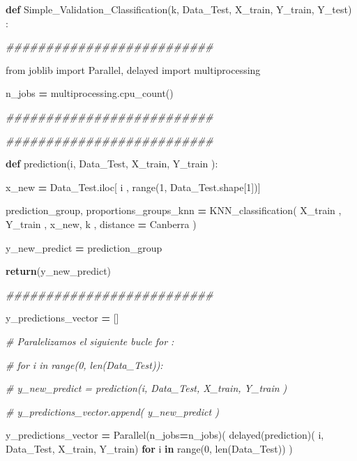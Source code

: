 \documentclass[
  11pt,
  a4paper,
]{article}
\newenvironment{Shaded}{\begin{snugshade}}{\end{snugshade}}
\newcommand{\BuiltInTok}[1]{#1}
\newcommand{\CommentTok}[1]{\textcolor[rgb]{0.56,0.35,0.01}{\textit{#1}}}
\newcommand{\ControlFlowTok}[1]{\textcolor[rgb]{0.13,0.29,0.53}{\textbf{#1}}}
\newcommand{\DecValTok}[1]{\textcolor[rgb]{0.00,0.00,0.81}{#1}}
\newcommand{\ImportTok}[1]{#1}
\newcommand{\KeywordTok}[1]{\textcolor[rgb]{0.13,0.29,0.53}{\textbf{#1}}}
\newcommand{\NormalTok}[1]{#1}
\newcommand{\OperatorTok}[1]{\textcolor[rgb]{0.81,0.36,0.00}{\textbf{#1}}}
\newcommand{\StringTok}[1]{\textcolor[rgb]{0.31,0.60,0.02}{#1}}
\begin{document}
\begin{Shaded}
\begin{Highlighting}[]
\KeywordTok{def}\NormalTok{ Simple\_Validation\_Classification(k, Data\_Test, X\_train, Y\_train, Y\_test) :}

    \CommentTok{\#\#\#\#\#\#\#\#\#\#\#\#\#\#\#\#\#\#\#\#\#\#\#\#\#\#}

    \ImportTok{from}\NormalTok{ joblib }\ImportTok{import}\NormalTok{ Parallel, delayed}
    \ImportTok{import}\NormalTok{ multiprocessing}

\NormalTok{    n\_jobs  }\OperatorTok{=}\NormalTok{ multiprocessing.cpu\_count()}

    \CommentTok{\#\#\#\#\#\#\#\#\#\#\#\#\#\#\#\#\#\#\#\#\#\#\#\#\#\#}

    \CommentTok{\#\#\#\#\#\#\#\#\#\#\#\#\#\#\#\#\#\#\#\#\#\#\#\#\#\#}

    \KeywordTok{def}\NormalTok{ prediction(i, Data\_Test, X\_train, Y\_train ):}

\NormalTok{     x\_new }\OperatorTok{=}\NormalTok{ Data\_Test.iloc[ i , }\BuiltInTok{range}\NormalTok{(}\DecValTok{1}\NormalTok{, Data\_Test.shape[}\DecValTok{1}\NormalTok{])]}

\NormalTok{     prediction\_group, proportions\_groups\_knn  }\OperatorTok{=}\NormalTok{  KNN\_classification( X\_train , Y\_train , x\_new, k , distance }\OperatorTok{=} \StringTok{\textquotesingle{}Canberra\textquotesingle{}}\NormalTok{ )}
     
\NormalTok{     y\_new\_predict }\OperatorTok{=}\NormalTok{ prediction\_group}

     \ControlFlowTok{return}\NormalTok{(y\_new\_predict)}

    \CommentTok{\#\#\#\#\#\#\#\#\#\#\#\#\#\#\#\#\#\#\#\#\#\#\#\#\#\#}

\NormalTok{    y\_predictions\_vector }\OperatorTok{=}\NormalTok{ []}

    \CommentTok{\# Paralelizamos el siguiente bucle for :}

    \CommentTok{\# for i in  range(0, len(Data\_Test)):}

        \CommentTok{\# y\_new\_predict = prediction(i, Data\_Test, X\_train, Y\_train )}

        \CommentTok{\# y\_predictions\_vector.append( y\_new\_predict )}

    
\NormalTok{    y\_predictions\_vector }\OperatorTok{=}\NormalTok{ Parallel(n\_jobs}\OperatorTok{=}\NormalTok{n\_jobs)( delayed(prediction)( i, Data\_Test, X\_train, Y\_train) }\ControlFlowTok{for}\NormalTok{ i }\KeywordTok{in} \BuiltInTok{range}\NormalTok{(}\DecValTok{0}\NormalTok{, }\BuiltInTok{len}\NormalTok{(Data\_Test)) )}


\end{Highlighting}
\end{Shaded}
\end{document}
